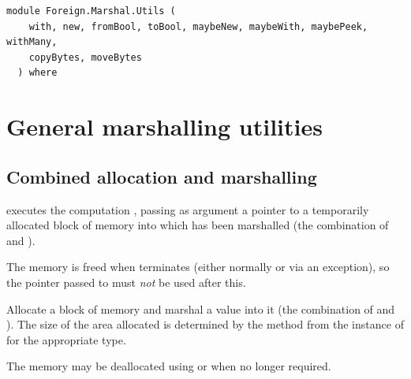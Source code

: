 \label{module:Foreign.Marshal.Utils}
\haddockbeginheader
{\haddockverb\begin{verbatim}
module Foreign.Marshal.Utils (
    with, new, fromBool, toBool, maybeNew, maybeWith, maybePeek, withMany,
    copyBytes, moveBytes
  ) where\end{verbatim}}
\haddockendheader

\section{General marshalling utilities}
\subsection{Combined allocation and marshalling}
\begin{haddockdesc}
\item[\begin{tabular}{@{}l}
with :: Storable a => a -> (Ptr a -> IO b) -> IO b
\end{tabular}]
{\haddockbegindoc
{} executes the computation , passing as argument
 a pointer to a temporarily allocated block of memory into which
  has been marshalled (the combination of  and ).\par
The memory is freed when  terminates (either normally or via an
 exception), so the pointer passed to  must \emph{not} be used after this.\par}
\end{haddockdesc}
\begin{haddockdesc}
\item[\begin{tabular}{@{}l}
new :: Storable a => a -> IO (Ptr a)
\end{tabular}]
{\haddockbegindoc
Allocate a block of memory and marshal a value into it
 (the combination of  and ).
 The size of the area allocated is determined by the 
 method from the instance of  for the appropriate type.\par
The memory may be deallocated using  or
  when no longer required.\par}
\end{haddockdesc}
